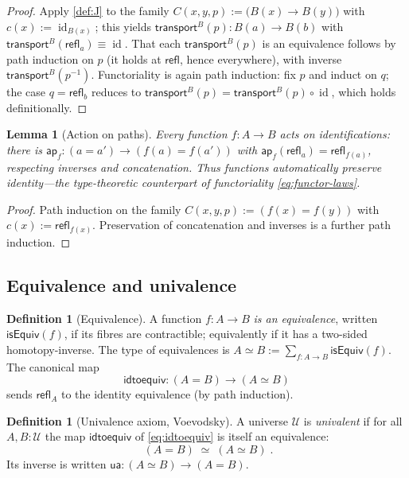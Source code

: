 \documentclass[12pt]{article}
\newtheorem{lemma}[theorem]{Lemma}
\theoremstyle{definition}
\newtheorem{definition}[theorem]{Definition}
\theoremstyle{remark}
\newcommand{\id}{\operatorname{id}}
\newcommand{\Univ}{\mathcal{U}}
\newcommand{\Refl}{\mathsf{refl}}
\newcommand{\ua}{\mathsf{ua}}
\newcommand{\idtoequiv}{\mathsf{idtoequiv}}
\newcommand{\transport}{\mathsf{transport}}
\newcommand{\ap}{\mathsf{ap}}
\begin{document}
\begin{proof}
Apply \cref{def:J} to the family $C(x,y,p):=\bigl(B(x)\to B(y)\bigr)$ with
$c(x):=\id_{B(x)}$; this yields $\transport^{B}(p):B(a)\to B(b)$ with
$\transport^{B}(\Refl_a)\equiv\id$. That each $\transport^{B}(p)$ is an
equivalence follows by path induction on $p$ (it holds at $\Refl$, hence
everywhere), with inverse $\transport^{B}(p^{-1})$. Functoriality is again path
induction: fix $p$ and induct on $q$; the case $q=\Refl_b$ reduces to
$\transport^{B}(p)=\transport^{B}(p)\circ\id$, which holds definitionally.
\end{proof}

\begin{lemma}[Action on paths]
\label{lem:ap}
Every function $f:A\to B$ acts on identifications: there is
$\ap_f:(a=a')\to(f(a)=f(a'))$ with $\ap_f(\Refl_a)=\Refl_{f(a)}$, respecting
inverses and concatenation. Thus functions automatically preserve identity---the
type-theoretic counterpart of functoriality \eqref{eq:functor-laws}.
\end{lemma}

\begin{proof}
Path induction on the family $C(x,y,p):=(f(x)=f(y))$ with $c(x):=\Refl_{f(x)}$.
Preservation of concatenation and inverses is a further path induction.
\end{proof}

\subsection{Equivalence and univalence}

\begin{definition}[Equivalence]
\label{def:equiv}
A function $f:A\to B$ \emph{is an equivalence}, written $\mathsf{isEquiv}(f)$, if
its fibres are contractible; equivalently if it has a two-sided
homotopy-inverse. The type of equivalences is
$A\simeq B:=\sum_{f:A\to B}\mathsf{isEquiv}(f)$. The canonical map
\begin{equation}
\label{eq:idtoequiv}
\idtoequiv:(A=B)\longrightarrow(A\simeq B)
\end{equation}
sends $\Refl_A$ to the identity equivalence (by path induction).
\end{definition}

\begin{definition}[Univalence axiom, Voevodsky]
\label{def:univalence}
A universe $\Univ$ is \emph{univalent} if for all $A,B:\Univ$ the map
$\idtoequiv$ of \eqref{eq:idtoequiv} is itself an equivalence:
\begin{equation}
\label{eq:ua}
\boxed{\;(A=B)\;\simeq\;(A\simeq B)\;.}
\end{equation}
Its inverse is written $\ua:(A\simeq B)\to(A=B)$.
\end{definition}
\end{document}
